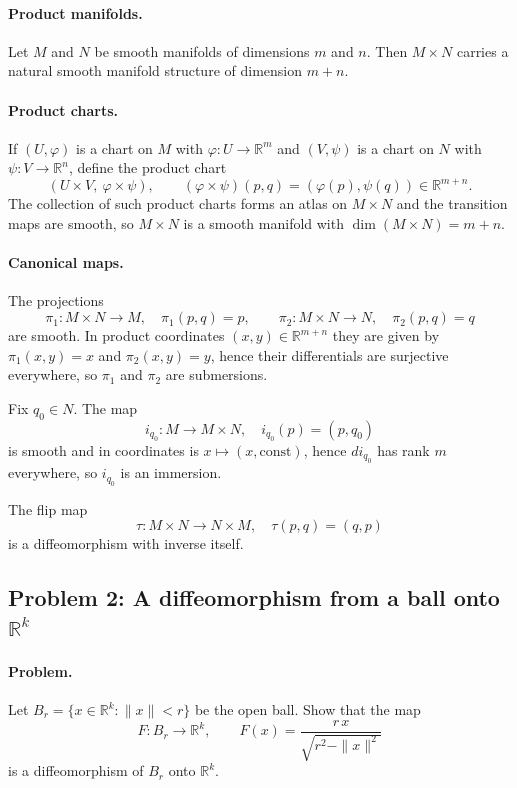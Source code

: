 \documentclass[12pt,a4paper]{article}
\newcommand{\R}{\mathbb{R}}
\theoremstyle{plain}
\theoremstyle{definition}      %
\begin{document}
\paragraph{Product manifolds.}
Let $M$ and $N$ be smooth manifolds of dimensions $m$ and $n$.
Then $M\times N$ carries a natural smooth manifold structure of dimension $m+n$.

\paragraph{Product charts.}
If $(U,\varphi)$ is a chart on $M$ with $\varphi:U\to \R^m$ and $(V,\psi)$ is a chart on $N$
with $\psi:V\to \R^n$, define the product chart
\[
(U\times V,\ \varphi\times\psi),\qquad
(\varphi\times\psi)(p,q)=(\varphi(p),\psi(q))\in \R^{m+n}.
\]
The collection of such product charts forms an atlas on $M\times N$ and the transition maps are smooth,
so $M\times N$ is a smooth manifold with $\dim(M\times N)=m+n$.

\paragraph{Canonical maps.}
The projections
\[
\pi_1:M\times N\to M,\quad \pi_1(p,q)=p,\qquad
\pi_2:M\times N\to N,\quad \pi_2(p,q)=q
\]
are smooth. In product coordinates $(x,y)\in\R^{m+n}$ they are given by
$\pi_1(x,y)=x$ and $\pi_2(x,y)=y$, hence their differentials are surjective everywhere,
so $\pi_1$ and $\pi_2$ are submersions.

Fix $q_0\in N$. The map
\[
i_{q_0}:M\to M\times N,\quad i_{q_0}(p)=(p,q_0)
\]
is smooth and in coordinates is $x\mapsto (x,\text{const})$, hence $di_{q_0}$ has rank $m$ everywhere,
so $i_{q_0}$ is an immersion.

The flip map
\[
\tau:M\times N\to N\times M,\quad \tau(p,q)=(q,p)
\]
is a diffeomorphism with inverse itself.


\subsection*{Problem 2: A diffeomorphism from a ball onto $\mathbb{R}^k$}
\paragraph{Problem.}
Let $B_r=\{x\in\mathbb{R}^k:\|x\|<r\}$ be the open ball. Show that the map
\[
F:B_r\longrightarrow \mathbb{R}^k,\qquad
F(x)=\frac{r\,x}{\sqrt{r^2-\|x\|^2}}
\]
is a diffeomorphism of $B_r$ onto $\mathbb{R}^k$.
\end{document}
